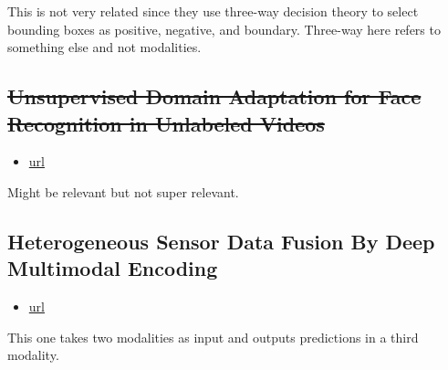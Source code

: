 This is not very related since they use three-way decision theory to select bounding boxes as positive, negative, and boundary.
Three-way here refers to something else and not modalities.

\subsection{\st{Unsupervised Domain Adaptation for Face Recognition in Unlabeled Videos}}
\begin{itemize}
\item \href{https://openaccess.thecvf.com/content\_ICCV\_2017/papers/Sohn\_Unsupervised\_Domain\_Adaptation\_ICCV\_2017\_paper.pdf}{url}
\end{itemize}
Might be relevant but not super relevant.


\subsection{Heterogeneous Sensor Data Fusion By Deep Multimodal Encoding}
\begin{itemize}
\item \href{https://ieeexplore.ieee.org/stamp/stamp.jsp?tp=&arnumber=7874158}{url}
\end{itemize}
This one takes two modalities as input and outputs predictions in a third modality.



